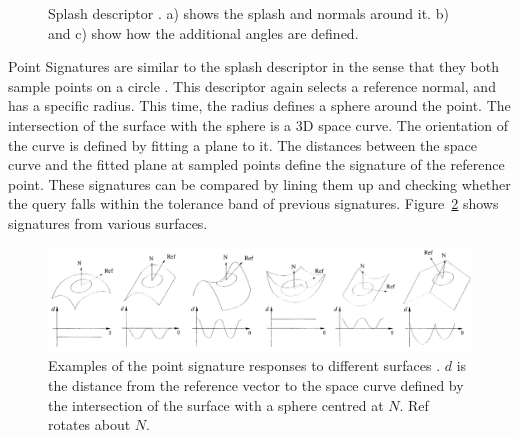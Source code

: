 \documentclass[10pt,a4paper]{article}
\begin{document}
\begin{figure}
  \centering
  \caption{Splash descriptor \cite{stein1992structural}. a) shows the splash and
    normals around it. b) and c) show how the additional angles are defined.
  }
  \label{fig:splash}
\end{figure}

Point Signatures are similar to the splash descriptor in the sense that they
both sample points on a circle \cite{chua1997point}. This descriptor again
selects a reference normal, and has a specific radius. This time, the radius
defines a sphere around the point. The intersection of the surface with the
sphere is a 3D space curve. The orientation of the curve is defined by fitting a
plane to it. The distances between the space curve and the fitted plane at
sampled points define the signature of the reference point. These signatures can
be compared by lining them up and checking whether the query falls within the
tolerance band of previous signatures. Figure~\ref{fig:pointsig} shows
signatures from various surfaces.

\begin{figure}
  \centering
  \includegraphics[width=\textwidth]{images/pointsig}
  \caption{Examples of the point signature responses to different surfaces
    \cite{chua1997point}. $d$ is the distance from the reference vector to the
    space curve defined by the intersection of the surface with a sphere centred
    at $N$. Ref rotates about $N$.}
  \label{fig:pointsig}
\end{figure}
\end{document}
